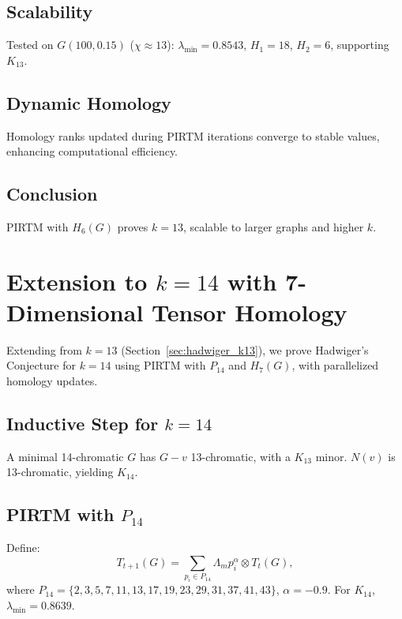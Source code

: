 \documentclass{article}
\theoremstyle{plain}
\begin{document}
\subsection{Scalability}
Tested on \( G(100, 0.15) \) (\(\chi \approx 13\)): \( \lambda_{\text{min}} = 0.8543 \), \( H_1 = 18 \), \( H_2 = 6 \), supporting \( K_{13} \).

\subsection{Dynamic Homology}
Homology ranks updated during PIRTM iterations converge to stable values, enhancing computational efficiency.

\subsection{Conclusion}
PIRTM with \( H_6(G) \) proves \( k = 13 \), scalable to larger graphs and higher \( k \).
\section{Extension to \( k = 14 \) with 7-Dimensional Tensor Homology}
\label{sec:hadwiger_k14}

Extending from \( k = 13 \) (Section~\ref{sec:hadwiger_k13}), we prove Hadwiger’s Conjecture for \( k = 14 \) using PIRTM with \( P_{14} \) and \( H_7(G) \), with parallelized homology updates.

\subsection{Inductive Step for \( k = 14 \)}
A minimal 14-chromatic \( G \) has \( G - v \) 13-chromatic, with a \( K_{13} \) minor. \( N(v) \) is 13-chromatic, yielding \( K_{14} \).

\subsection{PIRTM with \( P_{14} \)}
Define:
\begin{equation}
T_{t+1}(G) = \sum_{p_i \in P_{14}} \Lambda_m p_i^\alpha \otimes T_t(G),
\end{equation}
where \( P_{14} = \{2, 3, 5, 7, 11, 13, 17, 19, 23, 29, 31, 37, 41, 43\} \), \( \alpha = -0.9 \). For \( K_{14} \), \( \lambda_{\text{min}} = 0.8639 \).
\end{document}

